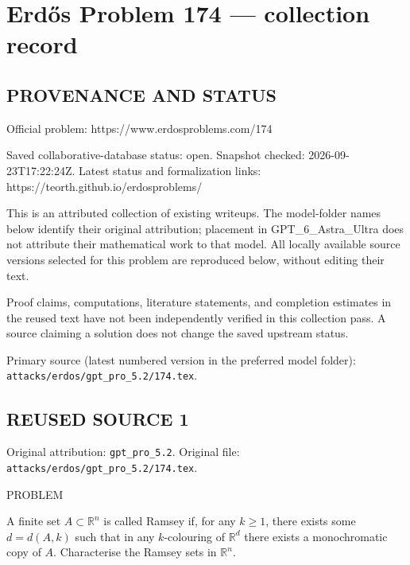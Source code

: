 \section*{Erd\H{o}s Problem 174 --- collection record}

\subsection*{PROVENANCE AND STATUS}
Official problem: https://www.erdosproblems.com/174

Saved collaborative-database status: open.
Snapshot checked: 2026-09-23T17:22:24Z.
Latest status and formalization links: https://teorth.github.io/erdosproblems/

This is an attributed collection of existing writeups. The model-folder names below identify their original attribution; placement in GPT\_6\_Astra\_Ultra does not attribute their mathematical work to that model. All locally available source versions selected for this problem are reproduced below, without editing their text.

Proof claims, computations, literature statements, and completion estimates in the reused text have not been independently verified in this collection pass. A source claiming a solution does not change the saved upstream status.

Primary source (latest numbered version in the preferred model folder): \texttt{attacks/erdos/gpt\_pro\_5.2/174.tex}.

\subsection*{REUSED SOURCE 1}
Original attribution: \texttt{gpt\_pro\_5.2}.
Original file: \texttt{attacks/erdos/gpt\_pro\_5.2/174.tex}.


PROBLEM

A finite set $A\subset \mathbb{R}^n$ is called Ramsey if, for any $k\geq 1$, there exists some $d=d(A,k)$ such that in any $k$-colouring of $\mathbb{R}^d$ there exists a monochromatic copy of $A$. Characterise the Ramsey sets in $\mathbb{R}^n$.

